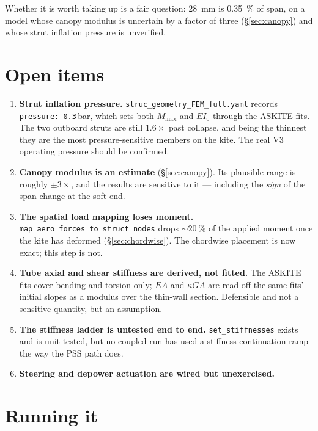 \documentclass[11pt,a4paper]{article}
\newcommand{\code}[1]{\texttt{\small #1}}
\begin{document}
Whether it is worth taking up is a fair question: \SI{28}{\milli\metre} is
\SI{0.35}{\percent} of span, on a model whose canopy modulus is uncertain by a
factor of three (\S\ref{sec:canopy}) and whose strut inflation pressure is
unverified.

\section{Open items}

\begin{enumerate}[leftmargin=2em]
  \item \textbf{Strut inflation pressure.} \code{struc\_geometry\_FEM\_full.yaml}
    records \code{pressure: 0.3}\,bar, which sets both $M_{\max}$ and $EI_0$
    through the ASKITE fits. The two outboard struts are still $1.6\times$ past
    collapse, and being the thinnest they are the most pressure-sensitive
    members on the kite. The real V3 operating pressure should be confirmed.
  \item \textbf{Canopy modulus is an estimate} (\S\ref{sec:canopy}). Its
    plausible range is roughly $\pm3\times$, and the results are sensitive to it
    --- including the \emph{sign} of the span change at the soft end.
  \item \textbf{The spatial load mapping loses moment.}
    \code{map\_aero\_forces\_to\_struct\_nodes} drops ${\sim}\SI{20}{\percent}$
    of the applied moment once the kite has deformed
    (\S\ref{sec:chordwise}). The chordwise placement is now exact; this step is
    not.
  \item \textbf{Tube axial and shear stiffness are derived, not fitted.} The
    ASKITE fits cover bending and torsion only; $EA$ and $\kappa GA$ are read
    off the same fits' initial slopes as a modulus over the thin-wall section.
    Defensible and not a sensitive quantity, but an assumption.
  \item \textbf{The stiffness ladder is untested end to end.}
    \code{set\_stiffnesses} exists and is unit-tested, but no coupled run has
    used a stiffness continuation ramp the way the PSS path does.
  \item \textbf{Steering and depower actuation are wired but unexercised.}
\end{enumerate}

\section{Running it}
\end{document}
